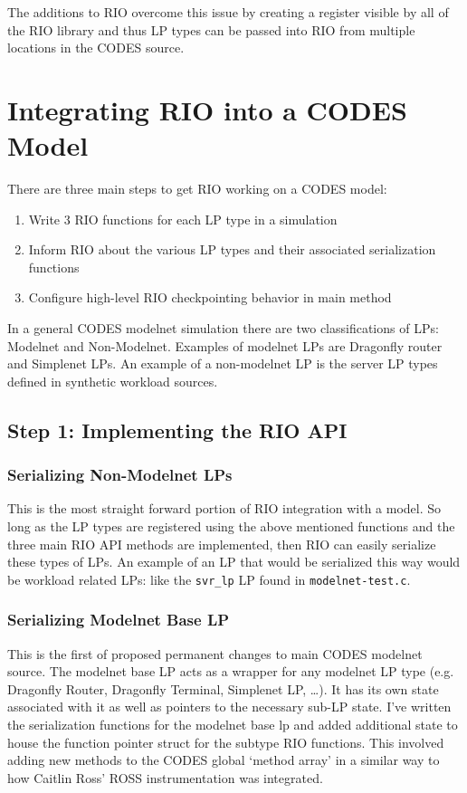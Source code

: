 \documentclass[letterpaper, 11 pt, conference]{IEEEtran}
\begin{document}
The additions to RIO overcome this issue by creating a register visible by all of the RIO library and thus LP types can be passed into RIO from multiple locations in the CODES source. 

\section{Integrating RIO into a CODES Model}
There are three main steps to get RIO working on a CODES model:

\begin{enumerate}
	\item Write 3 RIO functions for each LP type in a simulation \label{step1}
	\item Inform RIO about the various LP types and their associated serialization functions \label{step2}
	\item Configure high-level RIO checkpointing behavior in main method \label{step3}
\end{enumerate}

In a general CODES modelnet simulation there are two classifications of LPs: Modelnet and Non-Modelnet. Examples of modelnet LPs are Dragonfly router and Simplenet LPs. An example of a non-modelnet LP is the server LP types defined in synthetic workload sources.

\subsection{Step 1: Implementing the RIO API}

\subsubsection{Serializing Non-Modelnet LPs}
This is the most straight forward portion of RIO integration with a model. So long as the LP types are registered using the above mentioned functions and the three main RIO API methods are implemented, then RIO can easily serialize these types of LPs. An example of an LP that would be serialized this way would be workload related LPs: like the \texttt{svr\_lp} LP found in \texttt{modelnet-test.c}.

\subsubsection{Serializing Modelnet Base LP}
This is the first of proposed permanent changes to main CODES modelnet source. The modelnet base LP acts as a wrapper for any modelnet LP type (e.g. Dragonfly Router, Dragonfly Terminal, Simplenet LP, \ldots). It has its own state associated with it as well as pointers to the necessary sub-LP state. I've written the serialization functions for the modelnet base lp and added additional state to house the function pointer struct for the subtype RIO functions. This involved adding new methods to the CODES global `method array' in a similar way to how Caitlin Ross' ROSS instrumentation was integrated.
\end{document}
